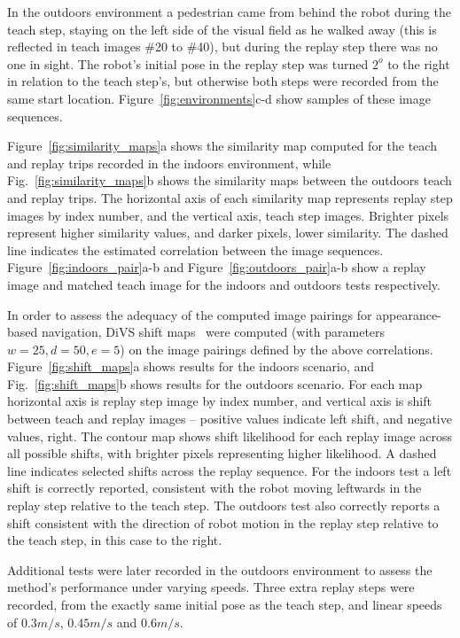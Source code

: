 \documentclass[twocolumn, 9pt,fleqn]{jsproceedings}
\begin{document}
In the outdoors environment a pedestrian came from behind the robot during the teach step, staying on the left side of the visual field as he walked away (this is reflected in teach images \#20 to \#40), but during the replay step there was no one in sight. The robot's initial pose in the replay step was turned $2^o$ to the right in relation to the teach step's, but otherwise both steps were recorded from the same start location. Figure~\ref{fig:environments}c-d show samples of these image sequences.

Figure~\ref{fig:similarity_maps}a shows the similarity map computed for the teach and replay trips recorded in the indoors environment, while Fig.~\ref{fig:similarity_maps}b shows the similarity maps between the outdoors teach and replay trips. The horizontal axis of each similarity map represents replay step images by index number, and the vertical axis, teach step images. Brighter pixels represent higher similarity values, and darker pixels, lower similarity. The dashed line indicates the estimated correlation between the image sequences. Figure~\ref{fig:indoors_pair}a-b and Figure~\ref{fig:outdoors_pair}a-b show a replay image and matched teach image for the indoors and outdoors tests respectively.

In order to assess the adequacy of the computed image pairings for appearance-based navigation, DiVS shift maps~\cite{HEL14d} were computed (with parameters $w = 25, d = 50, e = 5$) on the image pairings defined by the above correlations. Figure~\ref{fig:shift_maps}a shows results for the indoors scenario, and Fig.~\ref{fig:shift_maps}b shows results for the outdoors scenario. For each map horizontal axis is replay step image by index number, and vertical axis is shift between teach and replay images -- positive values indicate left shift, and negative values, right. The contour map shows shift likelihood for each replay image across all possible shifts, with brighter pixels representing higher likelihood. A dashed line indicates selected shifts across the replay sequence. For the indoors test a left shift is correctly reported, consistent with the robot moving leftwards in the replay step relative to the teach step. The outdoors test also correctly reports a shift consistent with the direction of robot motion in the replay step relative to the teach step, in this case to the right.

Additional tests were later recorded in the outdoors environment to assess the method's performance under varying speeds. Three extra replay steps were recorded, from the exactly same initial pose as the teach step, and linear speeds of $0.3m/s$, $0.45m/s$ and $0.6m/s$.
\end{document}
